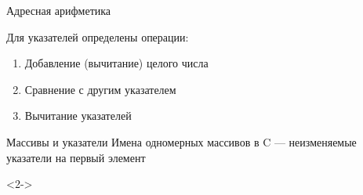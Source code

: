 \documentclass[aspectratio=169,14pt]{beamer}
\begin{document}
    \begin{frame}{Адресная арифметика}
        \begin{block}{Для указателей определены операции:}
            \begin{enumerate}
                \item Добавление (вычитание) целого числа
                \item Сравнение с другим указателем
                \item Вычитание указателей
            \end{enumerate}
        \end{block}
    \end{frame}

    \begin{frame}[fragile,t]{Массивы и указатели}
        Имена одномерных массивов в C --- неизменяемые указатели на первый элемент
        \begin{onlyenv}<2->
            \begin{center}
\end{center}
\end{onlyenv}
\end{frame}
\end{document}
